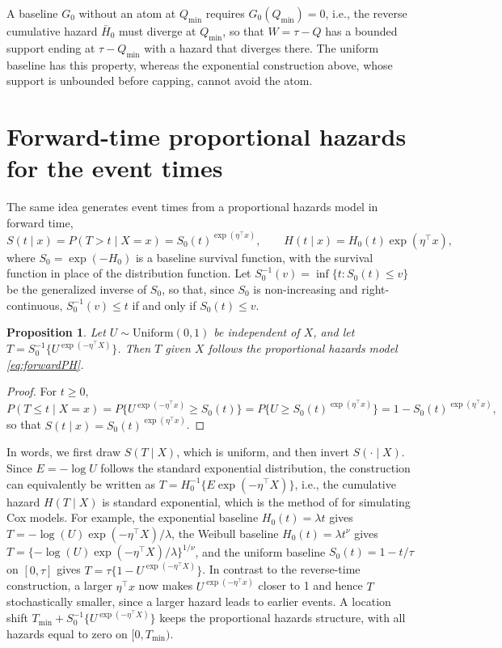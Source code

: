 \documentclass[11pt]{article}
\newtheorem{proposition}{Proposition}
\newcommand{\Qmin}{Q_{\min}}
\begin{document}
A baseline $G_0$ without an atom at $\Qmin$ requires $G_0(\Qmin) = 0$, i.e., the reverse
cumulative hazard $\bar H_0$ must diverge at $\Qmin$, so that $W = \tau - Q$ has a bounded
support ending at $\tau - \Qmin$ with a hazard that diverges there. The uniform baseline
has this property, whereas the exponential construction above, whose support is
unbounded before capping, cannot avoid the atom.

\section{Forward-time proportional hazards for the event times}

The same idea generates event times from a proportional hazards model in forward time,
\begin{equation}\label{eq:forwardPH}
S(t \mid x) = P(T > t \mid X = x) = S_0(t)^{\exp(\eta^\top x)}, \qquad
H(t \mid x) = H_0(t)\exp(\eta^\top x),
\end{equation}
where $S_0 = \exp(-H_0)$ is a baseline survival function, with the survival function in
place of the distribution function. Let $S_0^{-1}(v) = \inf\{t : S_0(t) \le v\}$ be the
generalized inverse of $S_0$, so that, since $S_0$ is non-increasing and right-continuous,
$S_0^{-1}(v) \le t$ if and only if $S_0(t) \le v$.

\begin{proposition}\label{prop:forward}
Let $U \sim \mathrm{Uniform}(0, 1)$ be independent of $X$, and let
$T = S_0^{-1}\{U^{\exp(-\eta^\top X)}\}$. Then $T$ given $X$ follows the proportional
hazards model \eqref{eq:forwardPH}.
\end{proposition}

\begin{proof}
For $t \ge 0$,
\begin{equation*}
P(T \le t \mid X = x) = P\{U^{\exp(-\eta^\top x)} \ge S_0(t)\}
= P\{U \ge S_0(t)^{\exp(\eta^\top x)}\} = 1 - S_0(t)^{\exp(\eta^\top x)},
\end{equation*}
so that $S(t \mid x) = S_0(t)^{\exp(\eta^\top x)}$.
\end{proof}

In words, we first draw $S(T \mid X)$, which is uniform, and then invert
$S(\cdot \mid X)$. Since $E = -\log U$ follows the standard exponential distribution, the
construction can equivalently be written as $T = H_0^{-1}\{E\exp(-\eta^\top X)\}$, i.e., the
cumulative hazard $H(T \mid X)$ is standard exponential, which is the method of
\citet{bender2005generating} for simulating Cox models. For example, the exponential
baseline $H_0(t) = \lambda t$ gives $T = -\log(U)\exp(-\eta^\top X)/\lambda$, the Weibull
baseline $H_0(t) = \lambda t^\nu$ gives
$T = \{-\log(U)\exp(-\eta^\top X)/\lambda\}^{1/\nu}$, and the uniform baseline
$S_0(t) = 1 - t/\tau$ on $[0, \tau]$ gives $T = \tau\{1 - U^{\exp(-\eta^\top X)}\}$. In
contrast to the reverse-time construction, a larger $\eta^\top x$ now makes
$U^{\exp(-\eta^\top x)}$ closer to 1 and hence $T$ stochastically smaller, since a larger
hazard leads to earlier events. A location shift $T_{\min} + S_0^{-1}\{U^{\exp(-\eta^\top X)}\}$
keeps the proportional hazards structure, with all hazards equal to zero on
$[0, T_{\min})$.
\end{document}
